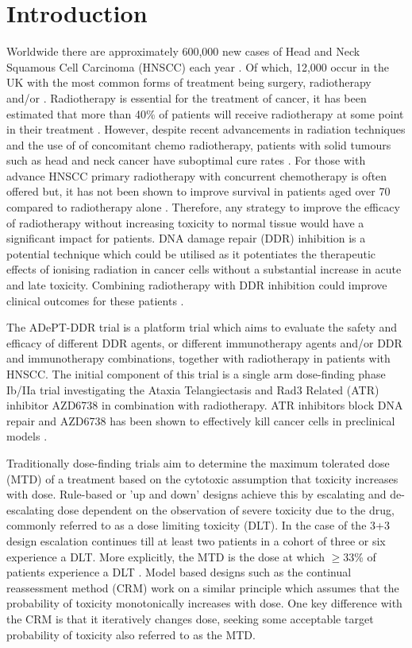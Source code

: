 \section{Introduction}

Worldwide there are approximately 600,000 new cases of Head and Neck Squamous Cell Carcinoma (HNSCC) each year \cite{stransky_mutational_2011}. Of which, 12,000 occur in the UK with the most common forms of treatment being surgery, radiotherapy and/or \cite{cancer_research_uk_head_2017}. Radiotherapy is essential for the treatment of cancer, it has been estimated that more than 40\% of patients will receive radiotherapy at some point in their treatment \cite{round_radiotherapy_2013}. However, despite recent advancements in radiation techniques and the use of of concomitant chemo radiotherapy, patients with solid tumours such as head and neck cancer have suboptimal cure rates \cite{cancer_research_uk_head_2017,cognetti_head_2008}. For those with advance HNSCC primary radiotherapy with concurrent chemotherapy is often offered but, it has not been shown to improve survival in patients aged over 70 compared to radiotherapy alone \cite{pignon_chemotherapy_2000}. Therefore, any strategy to improve the efficacy of radiotherapy without increasing toxicity to normal tissue would have a significant impact for patients. DNA damage repair (DDR) inhibition is a potential technique which could be utilised as it potentiates the therapeutic effects of ionising radiation in cancer cells without a substantial increase in acute and late toxicity. Combining radiotherapy with DDR inhibition could improve clinical outcomes for these patients \cite{chalmers_science_2016}.  

The ADePT-DDR trial is a platform trial which aims to evaluate the safety and efficacy of different DDR agents, or different immunotherapy agents and/or DDR and immunotherapy combinations, together with radiotherapy in patients with HNSCC. The initial component of this trial is a single arm dose-finding phase \RN{1}b/\RN{2}a trial investigating the Ataxia Telangiectasis and Rad3 Related (ATR) inhibitor AZD6738 in combination with radiotherapy. ATR inhibitors block DNA repair and AZD6738 has been shown to effectively kill cancer cells in preclinical models \cite{mei_ataxia_2019}. 

Traditionally dose-finding trials aim to determine the maximum tolerated dose (MTD) of a treatment based on the cytotoxic assumption that toxicity increases with dose. Rule-based or 'up and down' designs achieve this by escalating and de-escalating dose dependent on the observation of severe toxicity due to the drug,  commonly referred to as a dose limiting toxicity (DLT). In the case of the 3+3 design escalation continues till at least two patients in a cohort of three or six experience a DLT. More explicitly, the MTD is the dose at which $\geq$33\% of patients experience a DLT \cite{le_tourneau_dose_2009}. Model based designs such as the continual reassessment method (CRM) \cite{oquigley_continual_1990} work on a similar principle which assumes that the probability of toxicity monotonically increases with dose. One key difference with the CRM is that it iteratively changes dose, seeking some acceptable target probability of toxicity also referred to as the MTD. 

